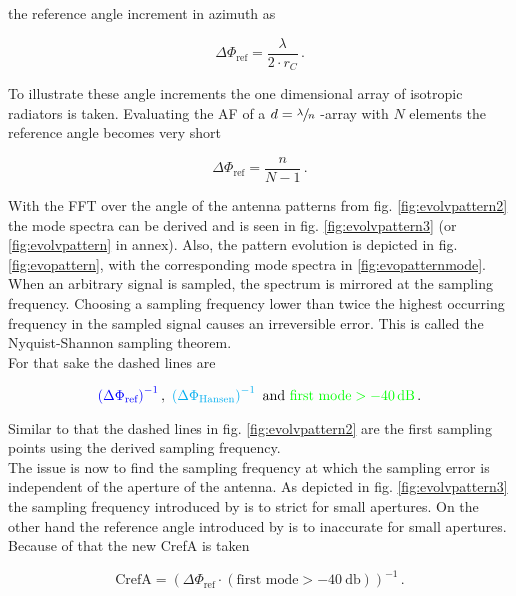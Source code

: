 the reference angle increment in azimuth as

\begin{equation}
\Delta\Phi_{\text{ref}} = \frac{\lambda}{2\cdot r_C}\,.
\end{equation}

To illustrate these angle increments the one dimensional array of isotropic radiators is taken. Evaluating the \ac{AF} of a $d = \sfrac{\lambda}{n}$ -array with $N$ elements the reference angle becomes very short

\begin{equation}
\Delta\Phi_{\text{ref}} = \frac{n}{N-1}\,.
\label{eq:1dinc}
\end{equation}

With the \ac{FFT} over the angle of the antenna patterns from fig. \ref{fig:evolvpattern2} the mode spectra can be derived and is seen in fig. \ref{fig:evolvpattern3} (or \ref{fig:evolvpattern} in annex). Also, the pattern evolution is depicted in fig. \ref{fig:evopattern}, with the corresponding mode spectra in \ref{fig:evopatternmode}.\\
When an arbitrary signal is sampled, the spectrum is mirrored at the sampling frequency. Choosing a sampling frequency lower than twice the highest occurring frequency in the sampled signal causes an irreversible error. This is called the Nyquist-Shannon sampling theorem.\\
For that sake the dashed lines are

\begin{equation}
\color{blue}\left(\Delta\Phi_{\text{ref}}\right)^{-1}\color{black},\ \color{cyan}\left(\Delta\Phi_\text{Hansen}\right)^{-1}\color{black}\ \text{and}\ \color{green}\text{first mode} > \SI{-40}{\decibel} \color{black}\,.
\end{equation}

Similar to that the dashed lines in fig. \ref{fig:evolvpattern2} are the first sampling points using the derived sampling frequency.\\
The issue is now to find the sampling frequency at which the sampling error is independent of the aperture of the antenna. As depicted in fig. \ref{fig:evolvpattern3} the sampling frequency introduced by \cite{hansen} is to strict for small apertures. On the other hand the reference angle introduced by \cite{2018arXiv180310993F} is to inaccurate for small apertures. Because of that the new \ac{CrefA} is taken

\begin{equation}
\text{CrefA} = \left(\Delta\Phi_{\text{ref}}\cdot\left(\text{first mode} > \SI{-40}{\decibel}\right)\right)^{-1}\,.
\end{equation} 

